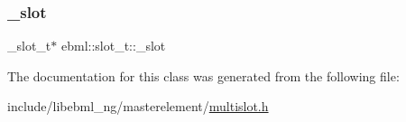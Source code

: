 \mbox{\label{classebml_1_1slot__t_a0ae4e9259d6abf3697978fa71d120e94}} 
\subsubsection{\texorpdfstring{\+\_\+slot}{\_slot}}
{\footnotesize\ttfamily \+\_\+slot\+\_\+t$\ast$ ebml\+::slot\+\_\+t\+::\+\_\+slot\hspace{0.3cm}{\ttfamily [protected]}}



The documentation for this class was generated from the following file\+:\begin{DoxyCompactItemize}
\item 
include/libebml\+\_\+ng/masterelement/\mbox{\hyperlink{multislot_8h}{multislot.\+h}}\end{DoxyCompactItemize}
